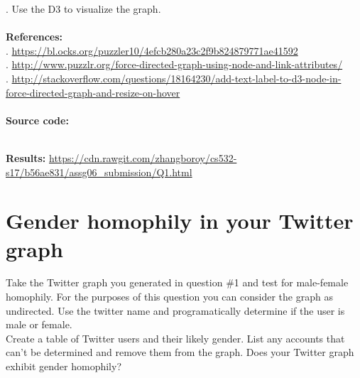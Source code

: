 \documentclass{article}
\begin{document}
		. Use the D3 to visualize the graph.\\\\
		\textbf{References:\\}
		. \url{https://bl.ocks.org/puzzler10/4efcb280a23c2f9b824879771ae41592}\\
		. \url{http://www.puzzlr.org/force-directed-graph-using-node-and-link-attributes/}\\
		. \url{http://stackoverflow.com/questions/18164230/add-text-label-to-d3-node-in-force-directed-graph-and-resize-on-hover}\\\\
		\textbf{Source code:}
		
		
		
		

		\noindent\\\textbf{Results: }\url{https://cdn.rawgit.com/zhangboroy/cs532-s17/b56ae831/assg06_submission/Q1.html}

		\section{Gender homophily in your Twitter graph}
		\indent Take the Twitter graph you generated in question \#1 and test for male-female homophily. For the purposes of this question you can consider the graph as undirected. Use the twitter name and programatically determine if the user is male or female.\\
		\indent Create a table of Twitter users and their likely gender. List any accounts that can't be determined and remove them from the graph. Does your Twitter graph exhibit gender homophily?\\
\end{document}
